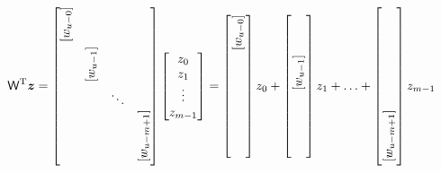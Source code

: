 \documentclass[preview,border=10pt]{standalone}
\begin{document}
\begin{equation*}
    \mathsf{W}^\text{T} \bm{z} =      
    \begin{bmatrix} 
        \rotatebox{90}{$[w_{u-0}]$}  \\
        & \rotatebox{90}{$[w_{u-1}]$} \\
        && \ddots  \\
        &&& \rotatebox{90}{$[w_{u-m+1}]$}
    \end{bmatrix} 
    \begin{bmatrix}
        z_{0} \\
        z_{1} \\
        \vdots   \\
        z_{m-1} \\
    \end{bmatrix}
    =    
    \begin{bmatrix} 
        {\rotatebox{90}{$[w_{u-0}]$}}  \\
        \phantom{\rotatebox{90}{$[w_{u-1}]$}} \\
        \phantom{\ddots}  \\
        \phantom{\rotatebox{90}{$[w_{u-1}]$}}
    \end{bmatrix} 
    z_0
    +
    \begin{bmatrix} 
        \phantom{\rotatebox{90}{$[w_{u-0}]$}} \\
        {\rotatebox{90}{$[w_{u-1}]$}} \\
        \phantom{\ddots}  \\
        \phantom{\rotatebox{90}{$[w_{u-1}]$}}
    \end{bmatrix} 
    z_1
    +
    \ldots 
    +
    \begin{bmatrix} 
        \phantom{\rotatebox{90}{$[w_{u-0}]$}} \\
        \phantom{\rotatebox{90}{$[w_{u-1}]$}} \\
        \phantom{\ddots}  \\
        {\rotatebox{90}{$[w_{u-m+1}]$}}
    \end{bmatrix} 
    z_{m-1}   
\end{equation*}
\end{document}
